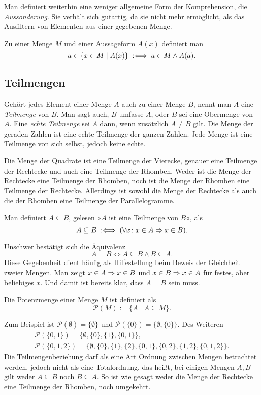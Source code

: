 Man definiert weiterhin eine weniger allgemeine Form der
Komprehension, die \emph{Aussonderung}. Sie verhält
sich gutartig, da sie nicht mehr ermöglicht, als das Ausfiltern von
Elementen aus einer gegebenen Menge.

\begin{Definition}[Aussonderung]\label{def:Aussonderung}\newlinefirst
Zu einer Menge $M$ und einer Aussageform $A(x)$ definiert man
\[a\in\{x\in M\mid A(x)\}\;:\Longleftrightarrow\; a\in M\land A(a).\]
\end{Definition}

\subsection{Teilmengen}

Gehört jedes Element einer Menge $A$ auch zu einer Menge $B$, nennt
man $A$ eine \emph{Teilmenge} von $B$. Man sagt auch,
$B$ umfasse $A$, oder $B$ sei eine Obermenge von $A$. Eine \emph{echte
Teilmenge} sei $A$ dann, wenn zusätzlich $A\ne B$ gilt. Die Menge der
geraden Zahlen ist eine echte Teilmenge der ganzen Zahlen. Jede Menge
ist eine Teilmenge von sich selbst, jedoch keine echte.

Die Menge der Quadrate ist eine Teilmenge der Vierecke, genauer eine
Teilmenge der Rechtecke und auch eine Teilmenge der Rhomben.
Weder ist die Menge der Rechtecke eine Teilmenge der Rhomben, noch
ist die Menge der Rhomben eine Teilmenge der Rechtecke. 
Allerdings ist sowohl die Menge der Rechtecke als auch die der Rhomben
eine Teilmenge der Parallelogramme.

\begin{Definition}[Teilmengenbeziehung]\label{def:Teilmenge}\newlinefirst
Man definiert $A\subseteq B$, gelesen »$A$ ist eine Teilmenge von $B$«, als
\[A\subseteq B\;:\Longleftrightarrow\; (\forall x\colon x\in A\Rightarrow x\in B).\]
\end{Definition}
Unschwer bestätigt sich die Äquivalenz
\[A = B \iff A\subseteq B\land B\subseteq A.\]
Diese Gegebenheit dient häufig als Hilfestellung beim Beweis der
Gleichheit zweier Mengen. Man zeigt $x\in A\Rightarrow x\in B$ und
$x\in B\Rightarrow x\in A$ für festes, aber beliebiges $x$. Und damit ist
bereits klar, dass $A = B$ sein muss.

\begin{Definition}[Potenzmenge]\newlinefirst
Die Potenzmenge einer Menge $M$ ist definiert als
\[\mathcal P(M) := \{A\mid A\subseteq M\}.\]
\end{Definition}
Zum Beispiel ist $\mathcal P(\emptyset) = \{\emptyset\}$ und
$\mathcal P(\{0\}) = \{\emptyset, \{0\}\}$. Des Weiteren
\begin{gather*}
\mathcal P(\{0,1\}) = \{\emptyset, \{0\}, \{1\}, \{0,1\}\},\\
\mathcal P(\{0,1,2\}) = \{\emptyset, \{0\}, \{1\}, \{2\}, \{0,1\}, \{0,2\}, \{1,2\}, \{0,1,2\}\}.
\end{gather*}
Die Teilmengenbeziehung darf als eine Art Ordnung zwischen Mengen
betrachtet werden, jedoch nicht als eine Totalordnung, das heißt,
bei einigen Mengen $A,B$ gilt weder $A\subseteq B$ noch $B\subseteq A$.
So ist wie gesagt weder die Menge der Rechtecke eine Teilmenge der
Rhomben, noch umgekehrt.


